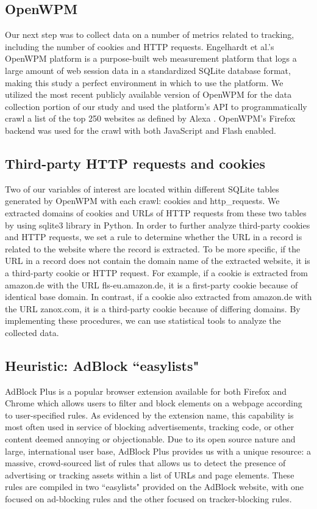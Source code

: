 \documentclass[journal]{IEEEtran}
\begin{document}
\subsection{OpenWPM}


Our next step was to collect data on a number of metrics related to tracking, including the number of cookies and HTTP requests. Engelhardt et al.'s OpenWPM platform is a purpose-built web measurement platform that logs a large amount of web session data in a standardized SQLite database format, making this study a perfect environment in which to use the platform. We utilized the most recent publicly available version of OpenWPM for the data collection portion of our study and used the platform's API to programmatically crawl a list of the top 250 websites as defined by Alexa \cite{Alexa}. OpenWPM's Firefox backend was used for the crawl with both JavaScript and Flash enabled.


\subsection{Third-party HTTP requests and cookies}

Two of our variables of interest are located within different SQLite tables generated by OpenWPM with each crawl: cookies and http\_requests. We extracted domains of cookies and URLs of HTTP requests from these two tables by using sqlite3 library in Python. In order to further analyze third-party cookies and HTTP requests, we set a rule to determine whether the URL in a record is related to the website where the record is extracted. To be more specific, if the URL in a record does not contain the domain name of the extracted website, it is a third-party cookie or HTTP request. For example, if a cookie is extracted from amazon.de with the URL fls-eu.amazon.de, it is a first-party cookie because of identical base domain. In contrast, if a cookie also extracted from amazon.de with the URL zanox.com, it is a third-party cookie because of differing domains. By implementing these procedures, we can use statistical tools to analyze the collected data.


\subsection{Heuristic: AdBlock ``easylists"}

AdBlock Plus \cite{adblock} is a popular browser extension available for both Firefox and Chrome which allows users to filter and block elements on a webpage according to user-specified rules. As evidenced by the extension name, this capability is most often used in service of blocking advertisements, tracking code, or other content deemed annoying or objectionable. Due to its open source nature and large, international user base, AdBlock Plus provides us with a unique resource: a massive, crowd-sourced list of rules that allows us to detect the presence of advertising or tracking assets within a list of URLs and page elements. These rules are compiled in two ``easylists" \cite{easylist} provided on the AdBlock website, with one focused on ad-blocking rules and the other focused on tracker-blocking rules.
\end{document}
